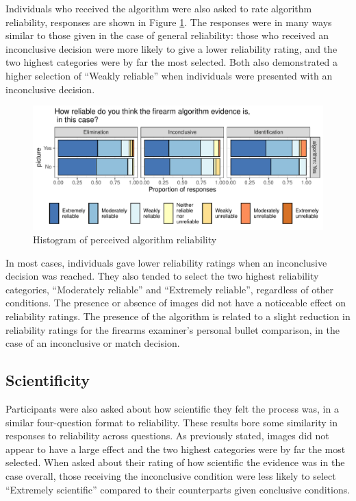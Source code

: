 \documentclass[print]{nuthesis}
\begin{document}
Individuals who received the algorithm were also asked to rate algorithm reliability, responses are shown in Figure \ref{fig:algrel}.
The responses were in many ways similar to those given in the case of general reliability: those who received an inconclusive decision were more likely to give a lower reliability rating, and the two highest categories were by far the most selected.
Both also demonstrated a higher selection of ``Weakly reliable'' when individuals were presented with an inconclusive decision.

\begin{figure}

{\centering \includegraphics[width=\linewidth]{thesis_files/figure-latex/algrel-1} 

}

\caption{Histogram of perceived algorithm reliability}\label{fig:algrel}
\end{figure}

In most cases, individuals gave lower reliability ratings when an inconclusive decision was reached.
They also tended to select the two highest reliability categories, ``Moderately reliable'' and ``Extremely reliable'', regardless of other conditions.
The presence or absence of images did not have a noticeable effect on reliability ratings.
The presence of the algorithm is related to a slight reduction in reliability ratings for the firearms examiner's personal bullet comparison, in the case of an inconclusive or match decision.

\hypertarget{scientificity}{%
\subsection{Scientificity}\label{scientificity}}

Participants were also asked about how scientific they felt the process was, in a similar four-question format to reliability.
These results bore some similarity in responses to reliability across questions.
As previously stated, images did not appear to have a large effect and the two highest categories were by far the most selected.
When asked about their rating of how scientific the evidence was in the case overall, those receiving the inconclusive condition were less likely to select ``Extremely scientific'' compared to their counterparts given conclusive conditions.
\end{document}
